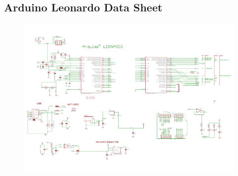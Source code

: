 \documentclass{article}
\begin{document}
\begin{appendices}
		\section{Arduino Leonardo Data Sheet}
		\begin{figure}[H]
			\centering
			\label{LeoDatasheet}
			\includegraphics*[scale = 0.75,angle=90]{ArduinoLeonardoDataSheet}
		\end{figure}
					
		
		
		\newpage
	
		
		
		\newpage	
		 		
	\end{appendices}
\end{document}
